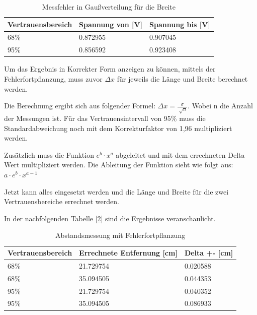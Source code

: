 \documentclass[12pt, oneside, a4paper, \docLanguage]{report}
\begin{document}
\begin{table}[H]
\centering
\begin{tabular}{|l|l|l|}
\hline
\textbf{Vertrauensbereich} & \textbf{Spannung von {[}V{]}} & \textbf{Spannung bis {[}V{]}} \\ \hline
68\%                       & 0.872955                      & 0.907045                      \\ \hline
95\%                       & 0.856592                      & 0.923408                      \\ \hline
\end{tabular}
\caption{Messfehler in Gaußverteilung für die Breite}
\label{fig:VERSUCH_3_AUSWERTUNG_BREITE_TABELLE}
\end{table}


Um das Ergebnis in Korrekter Form anzeigen zu können, mittels der Fehlerfortpflanzung, muss zuvor $\Delta x$ für jeweils die Länge und Breite berechnet werden. 

Die Berechnung ergibt sich aus folgender Formel:  $\Delta x = \frac{\sigma}{\sqrt[]{n}}$. Wobei n die Anzahl der Messungen ist. Für das Vertrauensintervall von 95\% muss die Standardabweichung noch mit dem Korrekturfaktor von 1,96 multipliziert werden.

Zusätzlich muss die Funktion $e^b \cdot x^a$ abgeleitet und mit dem errechneten Delta Wert multipliziert werden. Die Ableitung der Funktion sieht wie folgt aus: $a \cdot e^b \cdot x^{a-1}$

Jetzt kann alles eingesetzt werden und die Länge und Breite für die zwei Vertrauensbereiche errechnet werden.

In der nachfolgenden Tabelle [\ref{fig:VERSUCH_3_AUSWERTUNG_ERGEBNISSE_IN_CM_TABELLE}] sind die Ergebnisse veranschaulicht.
\begin{table}[]
\centering
\begin{tabular}{|l|l|l|}
\hline
\textbf{Vertrauensbereich} & \textbf{Errechnete Entfernung {[}cm{]}} & \textbf{Delta +- {[}cm{]}} \\ \hline
68\%                       & 21.729754                               & 0.020588                   \\ \hline
68\%                       & 35.094505                               & 0.044353                   \\ \hline
95\%                       & 21.729754                               & 0.040352                   \\ \hline
95\%                       & 35.094505                               & 0.086933                   \\ \hline
\end{tabular}
\caption{Abstandsmessung mit Fehlerfortpflanzung}
\label{fig:VERSUCH_3_AUSWERTUNG_ERGEBNISSE_IN_CM_TABELLE}
\end{table}
\end{document}
